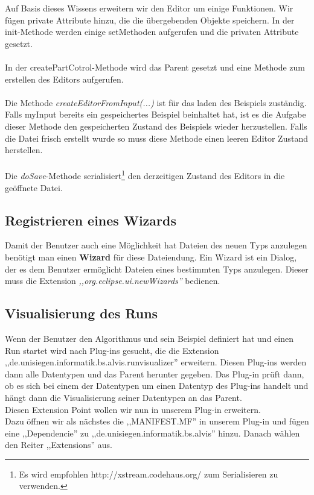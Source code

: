 \documentclass[10pt,a4paper]{article}
\begin{document}
Auf Basis dieses Wissens erweitern wir den Editor um einige Funktionen.
Wir fügen private Attribute hinzu, die die übergebenden Objekte speichern.
In der init-Methode werden einige setMethoden aufgerufen und die privaten Attribute gesetzt.
\\ \\
In der createPartCotrol-Methode wird das Parent gesetzt und eine Methode zum erstellen des Editors aufgerufen.
\\ \\
Die Methode \textit{createEditorFromInput(...)} ist für das laden des Beispiels zuständig. Falls myInput bereits ein gespeichertes Beispiel beinhaltet hat, ist es die Aufgabe dieser Methode den gespeicherten Zustand des Beispiels wieder herzustellen. Falls die Datei frisch erstellt wurde so muss diese Methode einen leeren Editor Zustand herstellen.
\\ \\
Die \textit{doSave}-Methode serialisiert\footnote{Es wird empfohlen http://xstream.codehaus.org/ zum Serialisieren zu verwenden. } den derzeitigen Zustand des Editors in die geöffnete Datei.



\subsection{Registrieren eines Wizards}
Damit der Benutzer auch eine Möglichkeit hat Dateien des neuen Typs anzulegen benötigt man einen \textbf{Wizard} für diese Dateiendung. Ein Wizard ist ein Dialog, der es dem Benutzer ermöglicht Dateien eines bestimmten Typs anzulegen. Dieser muss die Extension \textit{,,org.eclipse.ui.newWizards''} bedienen.

\subsection{Visualisierung des Runs}
Wenn der Benutzer den Algorithmus und sein Beispiel definiert hat und einen Run startet wird nach Plug-ins gesucht, die die Extension ,,de.unisiegen.informatik.bs.alvis.runvisualizer'' erweitern. Diesen Plug-ins werden dann alle Datentypen und das Parent herunter gegeben. Das Plug-in prüft dann, ob es sich bei einem der Datentypen um einen Datentyp des Plug-ins handelt und hängt dann die Visualisierung seiner Datentypen an das Parent.
\\
Diesen Extension Point wollen wir nun in unserem Plug-in erweitern.
\\
Dazu öffnen wir als nächstes die ,,MANIFEST.MF'' in unserem Plug-in und fügen eine ,,Dependencie'' zu ,,de.unisiegen.informatik.bs.alvis'' hinzu. Danach wählen den Reiter ,,Extensions'' aus. 
\end{document}
